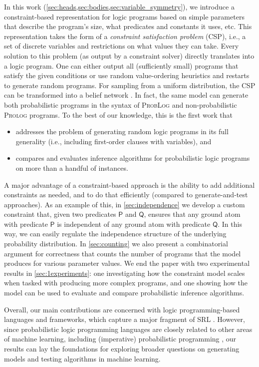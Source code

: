 In this work (\cref{sec:heads,sec:bodies,sec:variable_symmetry}), we introduce a
constraint-based representation for logic programs based on simple parameters
that describe the program's size, what predicates and constants it uses, etc.
This representation takes the form of a \emph{constraint satisfaction problem}
(CSP), i.e., a set of discrete variables and restrictions on what values they
can take. Every solution to this problem (as output by a constraint solver)
directly translates into a logic program. One can either output all
(sufficiently small) programs that satisfy the given conditions or use random
value-ordering heuristics and restarts to generate random programs. For sampling
from a uniform distribution, the CSP can be transformed into a belief network
\citep{DBLP:conf/aaai/DechterKBE02}. In fact, the same model can generate both
probabilistic programs in the syntax of \textsc{ProbLog}
\citep{DBLP:conf/ijcai/RaedtKT07} and non-probabilistic \textsc{Prolog} programs.
To the best of our knowledge, this is the first work that
\begin{itemize}
\item addresses the problem of generating random logic programs in its full
  generality (i.e., including first-order clauses with variables), and
\item compares and evaluates inference algorithms for probabilistic logic
  programs on more than a handful of instances.
\end{itemize}

A major advantage of a constraint-based approach is the ability to add
additional constraints as needed, and to do that efficiently (compared to
generate-and-test approaches). As an example of this, in \cref{sec:independence}
we develop a custom constraint that, given two predicates $\mathsf{P}$ and
$\mathsf{Q}$, ensures that any ground atom with predicate $\mathsf{P}$ is
independent of any ground atom with predicate $\mathsf{Q}$. In this way, we can
easily regulate the independence structure of the underlying probability
distribution. In \cref{sec:counting} we also present a combinatorial argument
for correctness that counts the number of programs that the model produces for
various parameter values. We end the paper with two experimental results in
\cref{sec:1experiments}: one investigating how the constraint model scales when
tasked with producing more complex programs, and one showing how the model can
be used to evaluate and compare probabilistic inference algorithms.

Overall, our main contributions are concerned with logic programming-based
languages and frameworks, which capture a major fragment of SRL
\citep{DBLP:series/synthesis/2016Raedt}. However, since probabilistic logic
programming languages are closely related to other areas of machine learning,
including (imperative) probabilistic programming
\citep{DBLP:journals/ml/RaedtK15}, our results can lay the foundations for
exploring broader questions on generating models and testing algorithms in
machine learning.

